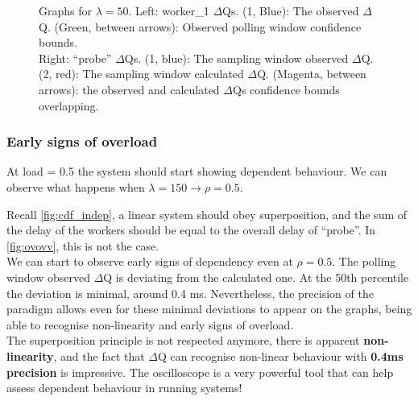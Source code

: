 \begin{figure}[H]
\begin{subfigure}{.5\textwidth}
                \label{fig:norm_ex_2}
            \end{subfigure}
            \label{fig:norm_ex}
            \caption{Graphs for $\lambda = 50$. Left: worker\_1 $\Delta$Qs. (1, Blue): The observed $\Delta$Q. (Green, between arrows): Observed polling window confidence bounds. \\
            Right: ``probe'' $\Delta$Qs. (1, blue): The sampling window observed $\Delta$Q. (2, red): The sampling window calculated $\Delta$Q. (Magenta, between arrows): the observed and calculated $\Delta$Qs confidence bounds overlapping.}
        \end{figure}
    
\subsubsection{Early signs of overload}
    
    At load = 0.5 the system should start showing dependent behaviour. We can observe what happens when $\lambda = 150 \rightarrow \rho = 0.5$.
    
    Recall \ref{fig:cdf_indep}, a linear system should obey superposition, and the sum of the delay of the workers should be equal to the overall delay of ``probe''. In \cref{fig:ovovv}, this is not the case. \\
    We can start to observe early signs of dependency even at $\rho = 0.5$. The polling window observed $\Delta$Q is deviating from the calculated one. At the 50th percentile the deviation is minimal, around 0.4 ms. Nevertheless, the precision of the paradigm allows even for these minimal deviations to appear on the graphs, being able to recognise non-linearity and early signs of overload. \\
    The superposition principle is not respected anymore, there is apparent \textbf{non-linearity}, and the fact that $\Delta$Q can recognise non-linear behaviour with \textbf{0.4ms precision} is impressive. The oscilloscope is a very powerful tool that can help assess dependent behaviour in running systems!
 
